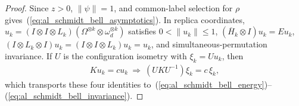 \begin{proof}\leanok
    Since $z>0$, $\|\psi\|=1$, and common-label selection for $\rho$ gives~(\ref{eq:al_schmidt_bell_asymptotics}).
    In replica coordinates, $u_k=(I\otimes I\otimes L_k)(\Omega^{\otimes k}\otimes\omega_d^{\otimes k})$
    satisfies $0<\|u_k\|\le1$, $(\overline H_k\otimes I)u_k=Eu_k$,
    $(I\otimes L_k\otimes I)u_k=(I\otimes I\otimes L_k)u_k=u_k$, and
    simultaneous-permutation invariance. If $U$ is the configuration isometry
    with $\xi_k=Uu_k$, then
    \begin{align}
        Ku_k=cu_k\ \Longrightarrow\ (UKU^{-1})\xi_k=c\,\xi_k,
        \label{eq:al_schmidt_bell_transport}
    \end{align}
    which transports these four identities to~(\ref{eq:al_schmidt_bell_energy})--(\ref{eq:al_schmidt_bell_invariance}).
\end{proof}

